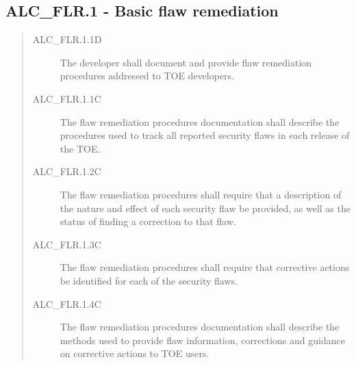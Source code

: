 \subsection{ALC\_FLR.1 - Basic flaw remediation}
\begin{quote}
    \begin{description}
        \item[ALC\_FLR.1.1D]{The developer shall document and provide flaw remediation procedures
            addressed to TOE developers.}
        \item[ALC\_FLR.1.1C]{The flaw remediation procedures documentation shall describe the
            procedures used to track all reported security flaws in each release of the TOE.}
        \item[ALC\_FLR.1.2C]{The flaw remediation procedures shall require that a description of the
            nature and effect of each security flaw be provided, as well as the status of finding
            a correction to that flaw.}
        \item[ALC\_FLR.1.3C]{The flaw remediation procedures shall require that corrective actions
            be identified for each of the security flaws.}
        \item[ALC\_FLR.1.4C]{The flaw remediation procedures documentation shall describe the
            methods used to provide flaw information, corrections and guidance on corrective actions
            to TOE users.}
    \end{description}
\end{quote}


